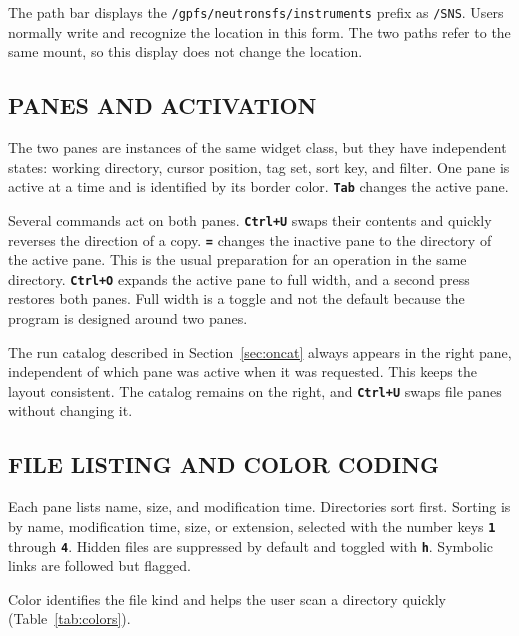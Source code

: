 \documentclass[tm]{ornltm}
\newcommand{\key}[1]{\textbf{\texttt{#1}}}
\begin{document}
The path bar displays the \texttt{/gpfs/neutronsfs/instruments} prefix as
\texttt{/SNS}. Users normally write and recognize the location in this form.
The two paths refer to the same mount, so this display does not change the
location.

\subsection{PANES AND ACTIVATION}

The two panes are instances of the same widget class, but they have independent
states: working directory, cursor position, tag set, sort key, and filter. One
pane is active at a time and is identified by its border color. \key{Tab}
changes the active pane.

Several commands act on both panes. \key{Ctrl+U} swaps their contents and quickly
reverses the direction of a copy. \key{=} changes the inactive pane to the
directory of the active pane. This is the usual preparation for an operation in
the same directory. \key{Ctrl+O} expands the active pane to full width, and a
second press restores both panes. Full width is a toggle and not the default
because the program is designed around two panes.

The run catalog described in Section~\ref{sec:oncat} always appears in the right
pane, independent of which pane was active when it was requested. This keeps the
layout consistent. The catalog remains on the right, and \key{Ctrl+U} swaps file
panes without changing it.

\subsection{FILE LISTING AND COLOR CODING}

Each pane lists name, size, and modification time. Directories sort first.
Sorting is by name, modification time, size, or extension, selected with the
number keys \key{1} through \key{4}. Hidden files are suppressed by default and
toggled with \key{h}. Symbolic links are followed but flagged.

Color identifies the file kind and helps the user scan a directory quickly
(Table~\ref{tab:colors}).
\end{document}

